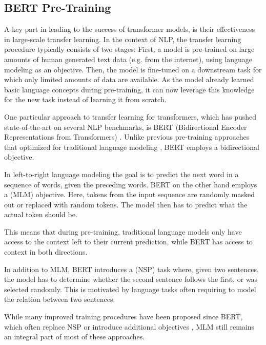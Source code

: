 \subsection{BERT Pre-Training}
A key part in leading to the success of transformer models, is their effectiveness in large-scale transfer learning. In the context of NLP, the transfer learning procedure typically consists of two stages: First, a model is pre-trained on large amounts of human generated text data (e.g. from the internet), using language modeling as an objective. Then, the model is fine-tuned on a downstream task for which only limited amounts of data are available. As the model already learned basic language concepts during pre-training, it can now leverage this knowledge for the new task instead of learning it from scratch.

One particular approach to transfer learning for transformers, which has pushed state-of-the-art on several NLP benchmarks, is BERT (Bidirectional Encoder Representations from Transformers) \cite{devlin-etal-2019-bert}. Unlike previous pre-training approaches that optimized for traditional  language modeling \cite{DBLP:journals/corr/abs-1801-06146,Peters:2018,radford2018improving}, BERT employs a bidirectional objective.

In left-to-right language modeling the goal is to predict the next word in a sequence of words, given the preceding words. BERT on the other hand employs a  (MLM) objective. Here, tokens from the input sequence are randomly masked out or replaced with random tokens. The model then has to predict what the actual token should be.

This means that during pre-training, traditional language models only have access to the context left to their current prediction, while BERT has access to context in both directions.

In addition to MLM, BERT introduces a  (NSP) task where, given two sentences, the model has to determine whether the second sentence follows the first, or was selected randomly. This is motivated by language tasks often requiring to model the relation between two sentences.

While many improved training procedures have been proposed since BERT, which often replace NSP or introduce additional objectives \cite{DBLP:journals/corr/abs-2003-10555, DBLP:journals/corr/abs-1907-11692, 10.5555/3454287.3454804, Lan2020ALBERT}, MLM still remains an integral part of most of these approaches.

